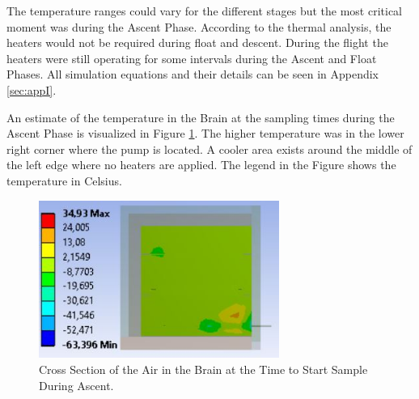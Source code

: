 The temperature ranges could vary for the different stages but the most critical moment was during the Ascent Phase. 
According to the thermal analysis, the heaters would not be required during float and descent. During the flight the heaters were still operating for some intervals during the Ascent and Float Phases. %
All simulation equations and their details can be seen in Appendix \ref{sec:appI}. 

An estimate of the temperature in the Brain at the sampling times during the Ascent Phase is visualized in Figure \ref{fig:Air-in-brain-4-6}. The higher temperature was in the lower right corner where the pump is located. A cooler area exists around the middle of the left edge where no heaters are applied. The legend in the Figure shows the temperature in Celsius.

\begin{figure}[H]
    \centering
    \includegraphics[width=0.7\textwidth]{4-experiment-design/img/Thermal/air-sampling-with-box}
    \caption{Cross Section of the Air in the Brain at the Time to Start Sample During Ascent.}
    \label{fig:Air-in-brain-4-6}
\end{figure}

